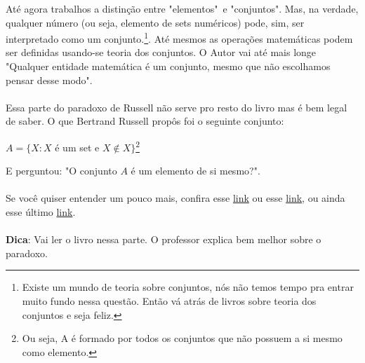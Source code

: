 \documentclass[main.tex]{subfiles}
\begin{document}
Até agora trabalhos a distinção entre "elementos"\ e "conjuntos". Mas, na verdade, qualquer número (ou seja, elemento de sets numéricos) pode, sim, ser interpretado como um conjunto.\footnote{Existe um mundo de teoria sobre conjuntos, nós não temos tempo pra entrar muito fundo nessa questão. Então vá atrás de livros sobre teoria dos conjuntos e seja feliz.}. Até mesmos as operações matemáticas podem ser definidas usando-se teoria dos conjuntos. O Autor vai até mais longe "Qualquer entidade matemática é um conjunto, mesmo que não escolhamos pensar desse modo".
\\~\\
Essa parte do paradoxo de Russell não serve pro resto do livro mas é bem legal de saber. O que Bertrand Russell propôs foi o seguinte conjunto:
\begin{center}
	$ A = \{ X : X $ é um set e $X \notin X \}$\footnote{Ou seja, A é formado por todos os conjuntos que não possuem a si mesmo como elemento.}
\end{center}
E perguntou: "O conjunto $A$ é um elemento de si mesmo?".
\\~\\
Se você quiser entender um pouco mais, confira esse \href{https://www.youtube.com/watch?v=AQTTYAM8BF0}{link} ou esse \href{https://www.youtube.com/watch?v=0Bs0lJRxOaI}{link}, ou ainda esse último \href{https://www.youtube.com/watch?v=HeQX2HjkcNo}{link}.
\\~\\
\textbf{Dica}: Vai ler o livro nessa parte. O professor explica bem melhor sobre o paradoxo.
\end{document}
